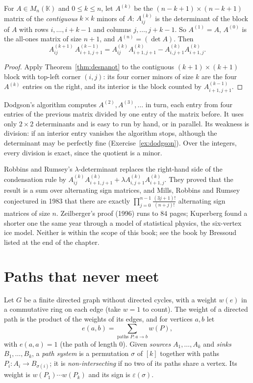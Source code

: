 \begin{corollary}\label{cor:dodgson}
For $A\in M_n(\mathbb K)$ and $0\le k\le n$, let $A^{(k)}$ be the $(n-k+1)\times(n-k+1)$ matrix of the \emph{contiguous}
$k\times k$ minors of $A$: $A^{(k)}_{ij}$ is the determinant of the block of $A$ with rows $i,\dots,i+k-1$ and columns
$j,\dots,j+k-1$. So $A^{(1)}=A$, $A^{(0)}$ is the all-ones matrix of size $n+1$, and $A^{(n)}=(\det A)$. Then
\[
A^{(k+1)}_{ij}\,A^{(k-1)}_{i+1,j+1}=A^{(k)}_{ij}A^{(k)}_{i+1,j+1}-A^{(k)}_{i,j+1}A^{(k)}_{i+1,j}.
\]
\end{corollary}
\begin{proof}
Apply Theorem~\ref{thm:desnanot} to the contiguous $(k+1)\times(k+1)$ block with top-left corner $(i,j)$: its four corner
minors of size $k$ are the four $A^{(k)}$ entries on the right, and its interior is the block counted by
$A^{(k-1)}_{i+1,j+1}$.
\end{proof}

Dodgson's algorithm computes $A^{(2)},A^{(3)},\dots$ in turn, each entry from four entries of the previous matrix
divided by one entry of the matrix before. It uses only $2\times2$ determinants and is easy to run by hand, or in
parallel. Its weakness is division: if an interior entry vanishes the algorithm stops, although the determinant may
be perfectly fine (Exercise~\ref{ex:dodgson}). Over the integers, every division is exact, since the quotient is a
minor.

\begin{remark}
Robbins and Rumsey's $\lambda$-determinant replaces the right-hand side of the condensation rule by
$A^{(k)}_{ij}A^{(k)}_{i+1,j+1}+\lambda A^{(k)}_{i,j+1}A^{(k)}_{i+1,j}$. They proved that the result is a sum over
alternating sign matrices, and Mills, Robbins and Rumsey conjectured in 1983 that there are exactly
$\prod_{j=0}^{n-1}\frac{(3j+1)!}{(n+j)!}$ alternating sign matrices of size $n$. Zeilberger's proof (1996) runs to $84$
pages; Kuperberg found a shorter one the same year through a model of statistical physics, the six-vertex ice model.
Neither is within the scope of this book; see the book by Bressoud listed at the end of the chapter.
\end{remark}

\section{Paths that never meet}\label{sec:lgv}

Let $G$ be a finite directed graph without directed cycles, with a weight $w(e)$ in a commutative ring on each edge
(take $w=1$ to count). The weight of a directed path is the product of the weights of its edges, and for vertices $a,b$
let
\[
e(a,b)=\sum_{\text{paths }P:a\to b}w(P),
\]
with $e(a,a)=1$ (the path of length $0$). Given \emph{sources} $A_1,\dots,A_k$ and \emph{sinks} $B_1,\dots,B_k$, a
\emph{path system} is a permutation $\sigma$ of $[k]$ together with paths $P_i:A_i\to B_{\sigma(i)}$; it is
\emph{non-intersecting} if no two of its paths share a vertex. Its weight is $w(P_1)\cdots w(P_k)$ and its sign is
$\varepsilon(\sigma)$.

